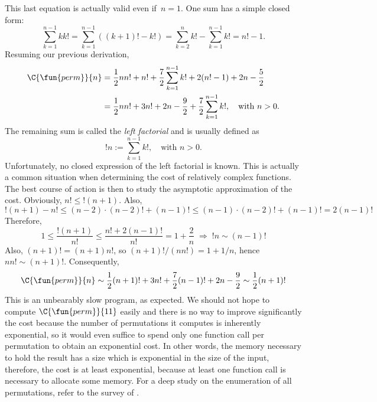 This last equation is actually valid even if~\(n = 1\). One sum has a
simple closed form:
\begin{equation*}
\sum_{k=1}^{n-1}{kk!} = \sum_{k=1}^{n-1}((k+1)! - k!) =
\sum_{k=2}^{n}{k!} - \sum_{k=1}^{n-1}{k!} = n! - 1.
\end{equation*}
Resuming our previous derivation,
\begin{align*}
\C{\fun{perm}}{n}
  &= \frac{1}{2}{nn!} + n! + \frac{7}{2}\sum_{k=1}^{n-1}{k!}
     + 2(n! - 1) + 2n - \frac{5}{2}\\
  &= \frac{1}{2}{nn!} + 3n!
     + 2n - \frac{9}{2} + \frac{7}{2}\sum_{k=1}^{n-1}{k!},\quad
     \text{with \(n > 0\)}.
\end{align*}
The remaining sum is called the \emph{left factorial}
\citep{Kurepa_1971} and is usually
defined as
\begin{equation*}
!n := \sum_{k=1}^{n-1}{k!},\quad \text{with \(n > 0\)}.
\end{equation*}
Unfortunately, no closed expression of the left factorial is
known. This is actually a common situation when determining the cost
of relatively complex functions. The best course of action is then to
study the asymptotic approximation of the cost. Obviously, \(n!
\leqslant !(n+1)\). Also,
\begin{equation*}
!(n+1) - n! \leqslant (n-2) \cdot (n-2)! + (n-1)! \leqslant
(n-1) \cdot (n-2)! + (n-1)! = 2 (n-1)!
\end{equation*}
Therefore,
\begin{equation*}
1 \leqslant \frac{!(n+1)}{n!} \leqslant \frac{n! + 2(n-1)!}{n!} = 1 +
\frac{2}{n} \;\Rightarrow\; !n \sim (n-1)!
\end{equation*}
Also, \((n+1)! = (n+1)n!\), so \((n+1)!/(nn!) = 1 + 1/n\), hence \(nn!
\sim (n+1)!\). Consequently,
\begin{equation*}
\abovedisplayshortskip=0pt
\abovedisplayskip=0pt
\C{\fun{perm}}{n} \sim \frac{1}{2}(n+1)! + 3n! + \frac{7}{2}(n-1)!
+ 2n - \frac{9}{2} \sim \frac{1}{2}(n+1)!
\end{equation*}
This is an unbearably slow program, as expected. We should not hope to
compute \(\C{\fun{perm}}{11}\) 
easily and there is no way to improve significantly the cost because
the number of permutations it computes is inherently exponential, so
it would even suffice to spend only one function call per permutation
to obtain an exponential cost. In other words, the memory necessary to
hold the result has a size which is exponential in the size of the
input, therefore, the cost is at least exponential, because at least
one function call is necessary to allocate some memory. For a deep
study on the enumeration of all permutations, refer to the survey of
\cite{Knuth_2011}.

